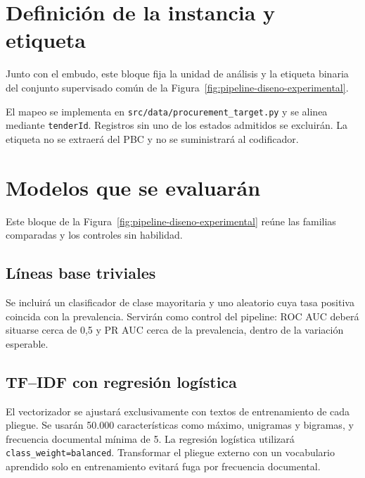\section{Definición de la instancia y etiqueta}
\label{sec:instancia_etiqueta}

Junto con el embudo, este bloque fija la unidad de análisis y la etiqueta binaria del conjunto supervisado común de la Figura~\ref{fig:pipeline-diseno-experimental}.



El mapeo se implementa en \texttt{src/data/procurement\_target.py} y se alinea mediante \texttt{tenderId}. Registros sin uno de los estados admitidos se excluirán. La etiqueta no se extraerá del PBC y no se suministrará al codificador.

\section{Modelos que se evaluarán}
\label{sec:modelos_evaluar}

Este bloque de la Figura~\ref{fig:pipeline-diseno-experimental} reúne las familias comparadas y los controles sin habilidad.

\begingroup
\def\metodoComoSubsecciones{}

\endgroup

\subsection{Líneas base triviales}

Se incluirá un clasificador de clase mayoritaria y uno aleatorio cuya tasa positiva coincida con la prevalencia. Servirán como control del pipeline: ROC AUC deberá situarse cerca de 0,5 y PR AUC cerca de la prevalencia, dentro de la variación esperable.

\subsection{TF--IDF con regresión logística}

El vectorizador se ajustará exclusivamente con textos de entrenamiento de cada pliegue. Se usarán 50.000 características como máximo, unigramas y bigramas, y frecuencia documental mínima de 5. La regresión logística utilizará \texttt{class\_weight=balanced}. Transformar el pliegue externo con un vocabulario aprendido solo en entrenamiento evitará fuga por frecuencia documental.

